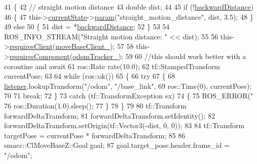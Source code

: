 \begin{DoxyCode}
41     \{
42         \textcolor{comment}{// straight motion distance}
43         \textcolor{keywordtype}{double} dist;
44 
45         \textcolor{keywordflow}{if} (!\hyperlink{classsm__dance__bot_1_1CbNavigateBackwards_ad5b1a7d85676aefa31f966baf61b6378}{backwardDistance})
46         \{
47             this->\hyperlink{classsmacc_1_1SmaccClientBehavior_af76fc9b877542ed5caf033f820c107d0}{currentState}->\hyperlink{classsmacc_1_1ISmaccState_a4982f2187ed6da337462721146e8ef70}{param}(\textcolor{stringliteral}{"straight\_motion\_distance"}, dist, 3.5);
48         \}
49         \textcolor{keywordflow}{else}
50         \{
51             dist = *\hyperlink{classsm__dance__bot_1_1CbNavigateBackwards_ad5b1a7d85676aefa31f966baf61b6378}{backwardDistance};
52         \}
53 
54         ROS\_INFO\_STREAM(\textcolor{stringliteral}{"Straight motion distance: "} << dist);
55 
56         this->\hyperlink{classsmacc_1_1SmaccClientBehavior_adc21bbd45d36bd81ca6f778ed161807a}{requiresClient}(\hyperlink{classsm__dance__bot_1_1CbNavigateBackwards_a8dea4225f55f14bf0a941baae383b07f}{moveBaseClient\_});
57 
58         this->\hyperlink{classsmacc_1_1SmaccClientBehavior_a011246bb1424f8bf8c9322f652db9d88}{requiresComponent}(\hyperlink{classsm__dance__bot_1_1CbNavigateBackwards_a2fd4de5f0f4f7bf374d8bfbfd87c6bf2}{odomTracker\_});
59 
60         \textcolor{comment}{//this should work better with a coroutine and await}
61         ros::Rate rate(10.0);
62         tf::StampedTransform currentPose;
63 
64         \textcolor{keywordflow}{while} (ros::ok())
65         \{
66             \textcolor{keywordflow}{try}
67             \{
68                 \hyperlink{classsm__dance__bot_1_1CbNavigateBackwards_a4ec9af0d5b94c5e0654a768c36bec85b}{listener}.lookupTransform(\textcolor{stringliteral}{"/odom"}, \textcolor{stringliteral}{"/base\_link"},
69                                          ros::Time(0), currentPose);
70 
71                 \textcolor{keywordflow}{break};
72             \}
73             \textcolor{keywordflow}{catch} (tf::TransformException ex)
74             \{
75                 ROS\_ERROR(\textcolor{stringliteral}{"%
76                 ros::Duration(1.0).sleep();
77             \}
78         \}
79 
80         tf::Transform forwardDeltaTransform;
81         forwardDeltaTransform.setIdentity();
82         forwardDeltaTransform.setOrigin(tf::Vector3(-dist, 0, 0));
83 
84         tf::Transform targetPose = currentPose * forwardDeltaTransform;
85 
86         smacc::ClMoveBaseZ::Goal goal;
87         goal.target\_pose.header.frame\_id = \textcolor{stringliteral}{"/odom"};
}
\end{DoxyCode}
